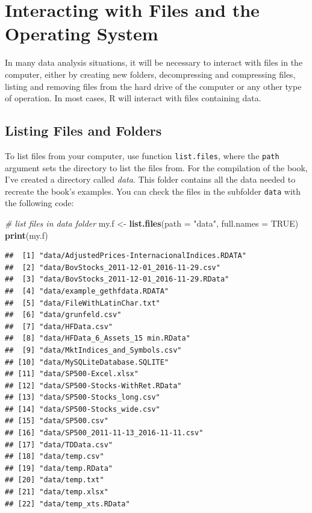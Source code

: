 \documentclass[11pt,]{book}
\newenvironment{Shaded}{\begin{snugshade}}{\end{snugshade}}
\newcommand{\KeywordTok}[1]{\textcolor[rgb]{0.27,0.27,0.27}{\textbf{#1}}}
\newcommand{\DataTypeTok}[1]{\textcolor[rgb]{0.27,0.27,0.27}{#1}}
\newcommand{\StringTok}[1]{\textcolor[rgb]{0.5,0.5,0.5}{#1}}
\newcommand{\CommentTok}[1]{\textcolor[rgb]{0.56,0.35,0.01}{\textit{#1}}}
\newcommand{\OtherTok}[1]{\textcolor[rgb]{0.56,0.35,0.01}{#1}}
\newcommand{\NormalTok}[1]{#1}
\begin{document}
\section{Interacting with Files and the Operating
System}\label{interacting-with-files-and-the-operating-system}

In many data analysis situations, it will be necessary to interact with
files in the computer, either by creating new folders, decompressing and
compressing files, listing and removing files from the hard drive of the
computer or any other type of operation. In most cases, R will interact
with files containing data.

\subsection{Listing Files and Folders}\label{listing-files-and-folders}

To list files from your computer, use function \texttt{list.files},
where the \texttt{path} argument sets the directory to list the files
from. For the compilation of the book, I've created a directory called
\emph{data}. This folder contains all the data needed to recreate the
book's examples. You can check the files in the subfolder \texttt{data}
with the following code: 

\begin{Shaded}
\begin{Highlighting}[]
\CommentTok{# list files in data folder}
\NormalTok{my.f <-}\StringTok{ }\KeywordTok{list.files}\NormalTok{(}\DataTypeTok{path =} \StringTok{"data"}\NormalTok{, }\DataTypeTok{full.names =} \OtherTok{TRUE}\NormalTok{)}
\KeywordTok{print}\NormalTok{(my.f)}
\end{Highlighting}
\end{Shaded}

\begin{verbatim}
##  [1] "data/AdjustedPrices-InternacionalIndices.RDATA"
##  [2] "data/BovStocks_2011-12-01_2016-11-29.csv"      
##  [3] "data/BovStocks_2011-12-01_2016-11-29.RData"    
##  [4] "data/example_gethfdata.RDATA"                  
##  [5] "data/FileWithLatinChar.txt"                    
##  [6] "data/grunfeld.csv"                             
##  [7] "data/HFData.csv"                               
##  [8] "data/HFData_6_Assets_15 min.RData"             
##  [9] "data/MktIndices_and_Symbols.csv"               
## [10] "data/MySQLiteDatabase.SQLITE"                  
## [11] "data/SP500-Excel.xlsx"                         
## [12] "data/SP500-Stocks-WithRet.RData"               
## [13] "data/SP500-Stocks_long.csv"                    
## [14] "data/SP500-Stocks_wide.csv"                    
## [15] "data/SP500.csv"                                
## [16] "data/SP500_2011-11-13_2016-11-11.csv"          
## [17] "data/TDData.csv"                               
## [18] "data/temp.csv"                                 
## [19] "data/temp.RData"                               
## [20] "data/temp.txt"                                 
## [21] "data/temp.xlsx"                                
## [22] "data/temp_xts.RData"
\end{verbatim}
\end{document}
